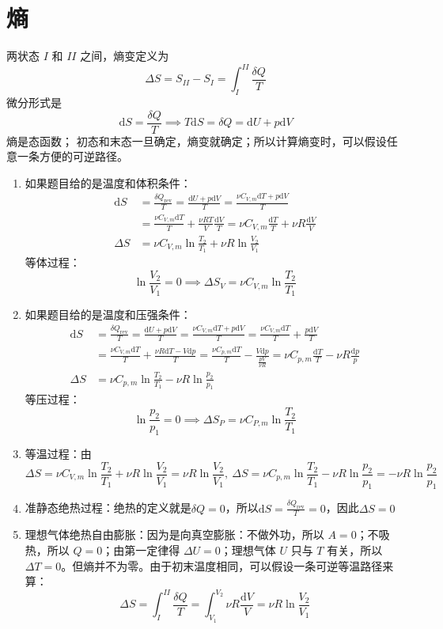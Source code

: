 
\section{熵}

\begin{definition}[熵，熵变]
    两状态 \(I\) 和 \(II\) 之间，熵变定义为\[
\Delta S=S_{II}-S_I=\int_I^{II}\frac{\delta Q}{T}
\]微分形式是\[\mathrm dS=\frac{\delta Q}{T}\implies T\mathrm dS=\delta Q=\mathrm dU+p\mathrm dV\]熵是态函数；
初态和末态一旦确定，熵变就确定；所以计算熵变时，可以假设任意一条方便的可逆路径。
\begin{enumerate}
\item 如果题目给的是温度和体积条件：\begin{align*}
    \mathrm dS&=\frac{\delta Q_{\mathrm{rev}}}{T}=\frac{\mathrm dU+p\mathrm dV}{T}=\frac{\nu C_{V,m}\mathrm dT+p\mathrm dV}{T}\\
    &=\frac{\nu C_{V,m}\mathrm dT}{T}+\frac{\nu RT}{V}\frac{\mathrm dV}{T}=\nu C_{V,m}\frac{\mathrm dT}{T}+\nu R\frac{\mathrm dV}{V}\\
    \Delta S&=\nu C_{V,m}\ln\frac{T_2}{T_1}+\nu R\ln\frac{V_2}{V_1}
\end{align*}
等体过程：\[\ln\frac{V_2}{V_1}=0\implies\Delta S_V=\nu C_{V,m}\ln\frac{T_2}{T_1}\]
\item 如果题目给的是温度和压强条件：\begin{align*}
\mathrm dS&=\frac{\delta Q_{\mathrm{rev}}}{T}=\frac{\mathrm dU+p\mathrm dV}{T}=\frac{\nu C_{V,m}\mathrm dT+p\mathrm dV}{T}=\frac{\nu C_{V,m}\mathrm dT}{T}+\frac{p\mathrm dV}{T}\\
&=\frac{\nu C_{V,m}\mathrm dT}{T}+\frac{\nu R\mathrm dT-V\mathrm dp}{T}=\frac{\nu C_{p,m}\mathrm dT}{T}-\frac{V\mathrm dp}{\frac{pV}{\nu R}}=\nu C_{p,m}\frac{\mathrm dT}{T}-\nu R\frac{\mathrm dp}{p}\\
\Delta S&=\nu C_{p,m}\ln\frac{T_2}{T_1}-\nu R\ln\frac{p_2}{p_1}
\end{align*}
等压过程：\[\ln\frac{p_2}{p_1}=0\implies\Delta S_P=\nu C_{P,m}\ln\frac{T_2}{T_1}\]
\item 等温过程：由\[\Delta S=\nu C_{V,m}\ln\frac{T_2}{T_1}+\nu R\ln\frac{V_2}{V_1}=\nu R\ln\frac{V_2}{V_1},~\Delta S=\nu C_{p,m}\ln\frac{T_2}{T_1}-\nu R\ln\frac{p_2}{p_1}=-\nu R\ln\frac{p_2}{p_1}\]
\item 准静态绝热过程：绝热的定义就是\(\delta Q=0\)，所以\(\mathrm dS=\frac{\delta Q_{\mathrm{rev}}}{T}=0\)，因此\(\Delta S=0\)
\item 理想气体绝热自由膨胀：因为是向真空膨胀：不做外功，所以 \(A=0\)；不吸热，所以 \(Q=0\)；由第一定律得 \(\Delta U=0\)；理想气体 \(U\) 只与 \(T\) 有关，所以 \(\Delta T=0\)。但熵并不为零。由于初末温度相同，可以假设一条可逆等温路径来算：\[\Delta S=\int_I^{II}\frac{\delta Q}{T}=\int_{V_1}^{V_2}\nu R\frac{\mathrm dV}{V}=\nu R\ln\frac{V_2}{V_1}\]
\end{enumerate}
\end{definition}


